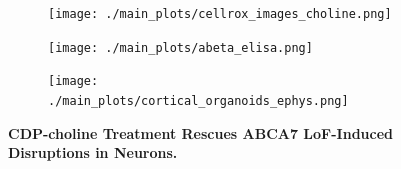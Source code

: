 \documentclass[12pt]{article}
\begin{document}
\begin{figure}[H]
\begin{subfigure}[t]{.4\textwidth}
        \caption{}
        \texttt{[image: ./main\_plots/cellrox\_images\_choline.png]}        
    \end{subfigure}
    \begin{subfigure}[t]{.39\textwidth}
        \caption{}
        \texttt{[image: ./main\_plots/abeta\_elisa.png]}        
    \end{subfigure}  
\begin{subfigure}[t]{.2\textwidth}
        \caption{}
        \texttt{[image: ./main\_plots/cortical\_organoids\_ephys.png]}        
    \end{subfigure} 
\caption{
        \textbf{CDP-choline Treatment Rescues ABCA7 LoF-Induced Disruptions in Neurons.}\\
    }
    \label{fig:main_choline}
\end{figure}
\end{document}
